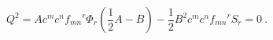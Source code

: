 \begin{equation}
Q^{2} = A c^{m} c^{n} {f_{mn}}^{r} \Phi_r (\frac{1}{2} A - B) -
\frac{1}{2} B^{2} c^{m} c^{n} {f_{mn}}^{r} S_{r} = 0~. \label{eq:byirmiuc}  
\end{equation}

